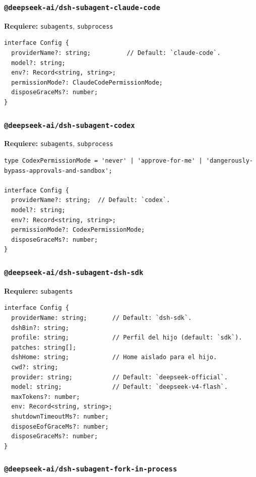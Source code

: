 \documentclass[11pt,a4paper]{article}
\begin{document}
\subsubsection*{\texttt{@deepseek-ai/dsh-subagent-claude-code}}


\textbf{Requiere:} \texttt{subagents}, \texttt{subprocess}


\begin{lstlisting}
interface Config {
  providerName?: string;          // Default: `claude-code`.
  model?: string;
  env?: Record<string, string>;
  permissionMode?: ClaudeCodePermissionMode;
  disposeGraceMs?: number;
}
\end{lstlisting}


\subsubsection*{\texttt{@deepseek-ai/dsh-subagent-codex}}


\textbf{Requiere:} \texttt{subagents}, \texttt{subprocess}


\begin{lstlisting}
type CodexPermissionMode = 'never' | 'approve-for-me' | 'dangerously-bypass-approvals-and-sandbox';

interface Config {
  providerName?: string;  // Default: `codex`.
  model?: string;
  env?: Record<string, string>;
  permissionMode?: CodexPermissionMode;
  disposeGraceMs?: number;
}
\end{lstlisting}


\subsubsection*{\texttt{@deepseek-ai/dsh-subagent-dsh-sdk}}


\textbf{Requiere:} \texttt{subagents}


\begin{lstlisting}
interface Config {
  providerName: string;       // Default: `dsh-sdk`.
  dshBin?: string;
  profile: string;            // Perfil del hijo (default: `sdk`).
  patches: string[];
  dshHome: string;            // Home aislado para el hijo.
  cwd?: string;
  provider: string;           // Default: `deepseek-official`.
  model: string;              // Default: `deepseek-v4-flash`.
  maxTokens?: number;
  env: Record<string, string>;
  shutdownTimeoutMs?: number;
  disposeEofGraceMs?: number;
  disposeGraceMs?: number;
}
\end{lstlisting}


\subsubsection*{\texttt{@deepseek-ai/dsh-subagent-fork-in-process}}
\end{document}
